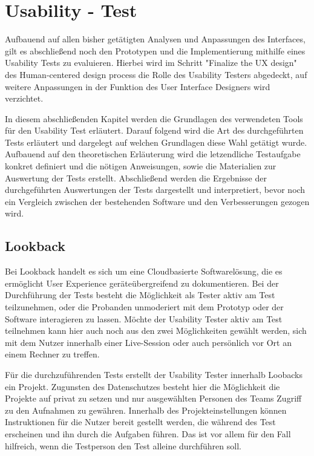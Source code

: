 \chapter{Usability - Test}\label{ch:outlook}

Aufbauend auf allen bisher getätigten Analysen und Anpassungen des Interfaces, gilt es abschließend noch den Prototypen und die Implementierung mithilfe eines Usability Tests zu evaluieren.
Hierbei wird im Schritt "Finalize the UX design" des Human-centered design process die Rolle des Usability Testers abgedeckt, auf weitere Anpassungen in der Funktion des User Interface Designers wird verzichtet.

In diesem abschließenden Kapitel werden die Grundlagen des verwendeten Tools für den Usability Test erläutert.
Darauf folgend wird die Art des durchgeführten Tests erläutert und dargelegt auf welchen Grundlagen diese Wahl getätigt wurde.
Aufbauend auf den theoretischen Erläuterung wird die letzendliche Testaufgabe konkret definiert und die nötigen Anweisungen, sowie die Materialien zur Auswertung der Tests erstellt.
Abschließend werden die Ergebnisse der durchgeführten Auswertungen der Tests dargestellt und interpretiert, bevor noch ein Vergleich zwischen der bestehenden Software und den Verbesserungen gezogen wird.

\section{Lookback}

Bei Lookback handelt es sich um eine Cloudbasierte Softwarelösung, die es ermöglicht User Experience geräteübergreifend zu dokumentieren.
Bei der Durchführung der Tests besteht die Möglichkeit als Tester aktiv am Test teilzunehmen, oder die Probanden unmoderiert mit dem Prototyp oder der Software interagieren zu lassen.
Möchte der Usability Tester aktiv am Test teilnehmen kann hier auch noch aus den zwei Möglichkeiten gewählt werden, sich mit dem Nutzer innerhalb einer Live-Session oder  auch persönlich vor Ort an einem Rechner zu treffen.

Für die durchzuführenden Tests erstellt der Usability Tester innerhalb Loobacks ein Projekt.
Zugunsten des Datenschutzes besteht hier die Möglichkeit die Projekte auf privat zu setzen und nur ausgewählten Personen des Teams Zugriff zu den Aufnahmen zu gewähren.
Innerhalb des Projekteinstellungen können Instruktionen für die Nutzer bereit gestellt werden, die während des Test erscheinen und ihn durch die Aufgaben führen.
Das ist vor allem für den Fall hilfreich, wenn die Testperson den Test alleine durchführen soll.

